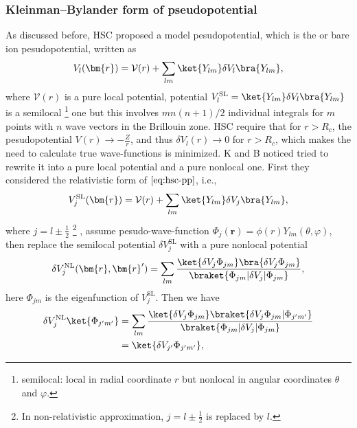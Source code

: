 
\subsubsection{Kleinman--Bylander form of pseudopotential}
As discussed before,
HSC proposed a model pesudopotential, which is the or bare ion pesudopotential, written as
\begin{equation}\label{eq:hsc-pp}
	V_l(\bm{r}) = \mathcal{V} (r) + \sum_{l m} \ket{Y_{lm}} \delta V_l \bra{Y_{lm}},
\end{equation}
where $\mathcal{V} (r)$ is a pure local potential, potential
$V_l^\text{SL} = \ket{Y_{lm}} \delta V_l \bra{Y_{lm}}$ is a semilocal
\footnote{
	semilocal: local in radial coordinate $r$ but nonlocal in angular coordinates $\theta$ and $\varphi$.
}
one but this involves $m n (n+1) / 2$ individual integrals for $m$ points
with $n$ wave vectors in the Brillouin zone.
HSC require that for $r > R_c$, the pesudopotential
$V (r) \rightarrow - \frac{ Z }{ r }$, and thus
$\delta V_l (r) \rightarrow 0 $ for $r > R_c$,
which makes the need to calculate true wave-functions is minimized.
K and B \cite{Kleinman:1982cx} noticed tried to rewrite it into a pure local potential and a pure
nonlocal one. First they considered the relativistic form of $\eqref{eq:hsc-pp}$,
i.e.,
\begin{equation}
	V_j^\text{SL} (\bm{r}) = \mathcal{V} (r) + \sum_{lm} \ket{Y_{lm}} \delta V_j \bra{Y_{lm}},
\end{equation}
where $j = l \pm \frac{ 1 }{ 2 }$
\footnote{
	In non-relativistic approximation, $j = l \pm \frac{ 1 }{ 2 }$ is replaced by $l$.
}
, assume pesudo-wave-function
$\Phi_j (\bm{r}) = \phi(r) Y_{lm} (\theta, \varphi)$,
then replace the semilocal potential $\delta V_j^\text{SL}$ with a pure nonlocal potential
\begin{equation}\label{eq:nl-pp}
	\delta V_j^\text{NL} (\bm{r}, \bm{r}')
	= \sum_{lm} \frac{ \ket{\delta V_j \Phi_{jm}}  \bra{\delta V_j \Phi_{jm}} }{
		\braket{ \Phi_{jm} | \delta V_j | \Phi_{jm} } },
\end{equation}
here $\Phi_{jm}$ is the eigenfunction of $V_j^\text{SL}$.
Then we have
\begin{equation}\label{eq:vnl-phi}
	\begin{split}
		\delta V_j^\text{NL} \ket{\Phi_{j'm'}}
		 & =
		\sum_{lm} \frac{
			\ket{\delta V_j \Phi_{jm}}  \braket{\delta V_j \Phi_{jm} | \Phi_{j'm'} }
		}{
			\braket{ \Phi_{jm} | \delta V_j | \Phi_{jm} }
		}                                       \\
		 & = \ket{ \delta V_{j'} \Phi_{j'm'} },
	\end{split}
\end{equation}
